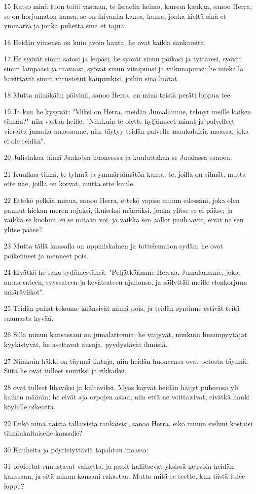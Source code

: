 \par 15 Katso minä tuon teitä vastaan, te Israelin heimo, kansan kaukaa, sanoo Herra; se on horjumaton kansa, se on ikivanha kansa, kansa, jonka kieltä sinä et ymmärrä ja jonka puhetta sinä et tajua.
\par 16 Heidän viinensä on kuin avoin hauta, he ovat kaikki sankareita.
\par 17 He syövät sinun satosi ja leipäsi, he syövät sinun poikasi ja tyttäresi, syövät sinun lampaasi ja raavaasi, syövät sinun viinipuusi ja viikunapuusi; he miekalla hävittävät sinun varustetut kaupunkisi, joihin sinä luotat.
\par 18 Mutta niinäkään päivinä, sanoo Herra, en minä teistä peräti loppua tee.
\par 19 Ja kun he kysyvät: "Miksi on Herra, meidän Jumalamme, tehnyt meille kaiken tämän?" niin vastaa heille: "Niinkuin te olette hyljänneet minut ja palvelleet vieraita jumalia maassanne, niin täytyy teidän palvella muukalaisia maassa, joka ei ole teidän".
\par 20 Julistakaa tämä Jaakobin huoneessa ja kuuluttakaa se Juudassa sanoen:
\par 21 Kuulkaa tämä, te tyhmä ja ymmärtämätön kansa, te, joilla on silmät, mutta ette näe, joilla on korvat, mutta ette kuule.
\par 22 Ettekö pelkää minua, sanoo Herra, ettekö vapise minun edessäni, joka olen pannut hiekan meren rajaksi, ikuiseksi määräksi, jonka ylitse se ei pääse; ja vaikka se kuohuu, ei se mitään voi, ja vaikka sen aallot pauhaavat, eivät ne sen ylitse pääse?
\par 23 Mutta tällä kansalla on uppiniskainen ja tottelematon sydän; he ovat poikenneet ja menneet pois.
\par 24 Eivätkä he sano sydämessänsä: "Peljätkäämme Herraa, Jumalaamme, joka antaa sateen, syyssateen ja kevätsateen ajallansa, ja säilyttää meille elonkorjuun määräviikot".
\par 25 Teidän pahat tekonne käänsivät nämä pois, ja teidän syntinne estivät teitä saamasta hyvää.
\par 26 Sillä minun kansassani on jumalattomia; he väijyvät, niinkuin linnunpyytäjät kyykistyvät, he asettavat ansoja, pyydystävät ihmisiä.
\par 27 Niinkuin häkki on täynnä lintuja, niin heidän huoneensa ovat petosta täynnä. Siitä he ovat tulleet suuriksi ja rikkaiksi,
\par 28 ovat tulleet lihaviksi ja kiiltäviksi. Myös käyvät heidän häijyt puheensa yli kaiken määrän; he eivät aja orpojen asiaa, niin että ne voittaisivat, eivätkä hanki köyhille oikeutta.
\par 29 Enkö minä näistä tällaisista rankaisisi, sanoo Herra, eikö minun sieluni kostaisi tämänkaltaiselle kansalle?
\par 30 Kauheita ja pöyristyttäviä tapahtuu maassa:
\par 31 profeetat ennustavat valhetta, ja papit hallitsevat yksissä neuvoin heidän kanssaan, ja sitä minun kansani rakastaa. Mutta mitä te teette, kun tästä tulee loppu?

